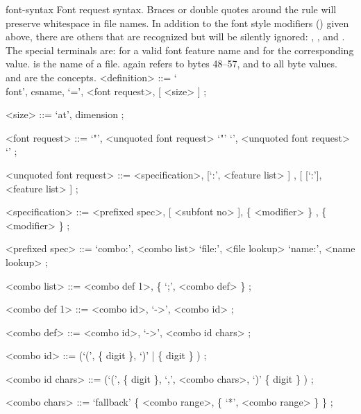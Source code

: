 \beginsyntaxfloat
  {font-syntax}
  {Font request syntax.
   Braces or double quotes around the
    rule will
   preserve whitespace in file names.
   In addition to the font style modifiers
   () given above, there
   are others that are recognized but will be silently
   ignored: ,
            , and
            .
   The special terminals are:
    for a valid font
      feature name and
    for the corresponding
      value.
    is the name of a  file.
     again refers to bytes 48--57, and
    to all byte values.
    and  are the \TEX concepts.}
%
      <definition>      ::= `\\font', {\sc csname}, `=', <font request>, [ <size> ] ;

      <size>            ::= `at', {\sc dimension} ;

      <font request>    ::= `"', <unquoted font request> `"'
      \alt                  `{', <unquoted font request> `}'
       ;

      <unquoted font request> ::= <specification>, [`:', <feature list> ]
      , [ [`:'], <feature list> ] ;

      <specification>    ::= <prefixed spec>, [ <subfont no> ], \{ <modifier> \}
      , \{ <modifier> \} ;

      <prefixed spec>    ::= `combo:', <combo list>
      \alt                   `file:', <file lookup>
      \alt                   `name:', <name lookup> ;

      <combo list>       ::= <combo def 1>, \{ `;', <combo def>  \} ;

      <combo def 1>      ::= <combo id>, `->', <combo id> ;

      <combo def>        ::= <combo id>, `->', <combo id chars> ;

      <combo id>         ::= (`(', \{ {\sc digit} \}, `)' | \{ {\sc digit} \} ) ;

      <combo id chars>   ::= (`(', \{ {\sc digit} \}, `,', <combo chars>, `)'
      \alt                   \{ {\sc digit} \} ) ;

      <combo chars>      ::= `fallback'
      \alt                   \{ <combo range>, \{ `*', <combo range> \} \} ;

